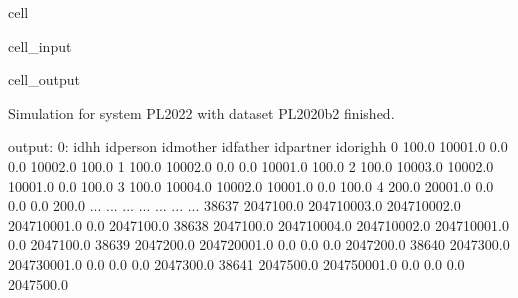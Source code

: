 \documentclass[letterpaper,10pt,english]{sphinxmanual}
\begin{document}
\begin{sphinxuseclass}{cell}
\begin{sphinxuseclass}{cell_input}
\begin{sphinxVerbatim}[commandchars=\\\{\}]
 \PYG{p}{[}\PYG{p}{]}\PYG{p}{[}\PYG{p}{]}\PYG{p}{[}\PYG{p}{]}
\end{sphinxVerbatim}

\end{sphinxuseclass}
\begin{sphinxuseclass}{cell_output}
\begin{sphinxVerbatim}[commandchars=\\\{\}]
Simulation for system PL\PYGZus{}2022 with dataset PL\PYGZus{}2020\PYGZus{}b2 finished.
\end{sphinxVerbatim}

\begin{sphinxVerbatim}[commandchars=\\\{\}]
output:               0:             idhh     idperson     idmother     idfather  idpartner   idorighh  \PYGZbs{}
0          100.0      10001.0          0.0          0.0    10002.0      100.0   
1          100.0      10002.0          0.0          0.0    10001.0      100.0   
2          100.0      10003.0      10002.0      10001.0        0.0      100.0   
3          100.0      10004.0      10002.0      10001.0        0.0      100.0   
4          200.0      20001.0          0.0          0.0        0.0      200.0   
...          ...          ...          ...          ...        ...        ...   
38637  2047100.0  204710003.0  204710002.0  204710001.0        0.0  2047100.0   
38638  2047100.0  204710004.0  204710002.0  204710001.0        0.0  2047100.0   
38639  2047200.0  204720001.0          0.0          0.0        0.0  2047200.0   
38640  2047300.0  204730001.0          0.0          0.0        0.0  2047300.0   
38641  2047500.0  204750001.0          0.0          0.0        0.0  2047500.0   


\end{sphinxVerbatim}
\end{sphinxuseclass}
\end{sphinxuseclass}
\end{document}
